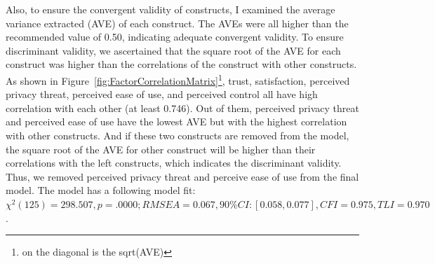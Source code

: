 Also, to ensure the convergent validity of constructs, I examined the average variance extracted (AVE) of each construct. The AVEs were all higher than the recommended value of 0.50, indicating adequate convergent validity. To ensure discriminant validity, we ascertained that the square root of the AVE for each construct was higher than the correlations of the construct with other constructs. As shown in Figure~\ref{fig:FactorCorrelationMatrix}\footnote{on the diagonal is the sqrt(AVE)}, trust, satisfaction, perceived privacy threat, perceived ease of use, and perceived control all have high correlation with each other (at least 0.746). Out of them, perceived privacy threat and perceived ease of use have the lowest AVE but with the highest correlation with other constructs. And if these two constructs are removed from the model, the square root of the AVE for other construct will be higher than their correlations with the left constructs, which indicates the discriminant validity. Thus, we removed perceived privacy threat and perceive ease of use from the final model.
The model has a following model fit: ${\chi}^{2}(125) = 298.507, p = .0000; RMSEA =
0.067, 90\% CI: [0.058, 0.077], CFI = 0.975, TLI = 0.970$.

